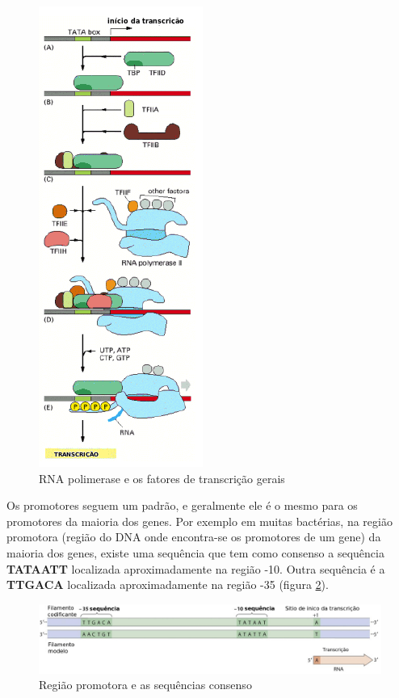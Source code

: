 \begin{figure}[htb!]
    \centering
    \includegraphics[scale=0.7]{./imagens/complexo_RNA-polimerase.png}
    \caption{RNA polimerase e os fatores de transcrição gerais \cite[Adaptada]{Alberts2002} }
    \label{fig:complexo_RNA-polimerase}
\end{figure}

Os promotores seguem um padrão, e geralmente ele é o mesmo para os promotores da maioria dos genes. Por exemplo em muitas bactérias, na região promotora (região do DNA onde encontra-se os promotores de um gene) da maioria dos genes, existe uma sequência que tem como consenso a sequência \textbf{TATAATT} localizada aproximadamente na região -10. Outra sequência é a \textbf{TTGACA} localizada aproximadamente na região -35 (figura \ref{fig:promotores_noDNA}).

\begin{figure}[htb!]
    \centering
    \includegraphics[scale=0.7]{./imagens/promotores_noDNA.jpg}
    \caption{Região promotora e as sequências consenso}
    \label{fig:promotores_noDNA}
\end{figure}



